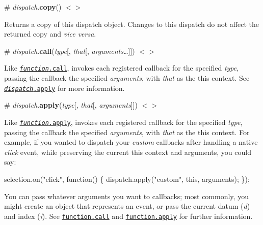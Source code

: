 \label{_dispatch_copy}%
\# {\itshape dispatch}.{\bfseries copy}() \href{https://github.com/d3/d3-dispatch/blob/master/src/dispatch.js#L49}{\tt $<$$>$}

Returns a copy of this dispatch object. Changes to this dispatch do not affect the returned copy and {\itshape vice versa}.

\label{_dispatch_call}%
\# {\itshape dispatch}.{\bfseries call}({\itshape type}\mbox{[}, {\itshape that}\mbox{[}, {\itshape arguments…}\mbox{]}\mbox{]}) \href{https://github.com/d3/d3-dispatch/blob/master/src/dispatch.js#L54}{\tt $<$$>$}

Like \href{https://developer.mozilla.org/en-US/docs/Web/JavaScript/Reference/Global_Objects/Function/call}{\tt {\itshape function}.call}, invokes each registered callback for the specified {\itshape type}, passing the callback the specified {\itshape arguments}, with {\itshape that} as the {\ttfamily this} context. See \href{#dispatch_apply}{\tt {\itshape dispatch}.apply} for more information.

\label{_dispatch_apply}%
\# {\itshape dispatch}.{\bfseries apply}({\itshape type}\mbox{[}, {\itshape that}\mbox{[}, {\itshape arguments}\mbox{]}\mbox{]}) \href{https://github.com/d3/d3-dispatch/blob/master/src/dispatch.js#L59}{\tt $<$$>$}

Like \href{https://developer.mozilla.org/en-US/docs/Web/JavaScript/Reference/Global_Objects/Function/call}{\tt {\itshape function}.apply}, invokes each registered callback for the specified {\itshape type}, passing the callback the specified {\itshape arguments}, with {\itshape that} as the {\ttfamily this} context. For example, if you wanted to dispatch your {\itshape custom} callbacks after handling a native {\itshape click} event, while preserving the current {\ttfamily this} context and arguments, you could say\+:


\begin{DoxyCode}
selection.on("click", function() \{
  dispatch.apply("custom", this, arguments);
\});
\end{DoxyCode}


You can pass whatever arguments you want to callbacks; most commonly, you might create an object that represents an event, or pass the current datum ({\itshape d}) and index ({\itshape i}). See \href{https://developer.mozilla.org/en/JavaScript/Reference/Global_Objects/Function/Call}{\tt function.\+call} and \href{https://developer.mozilla.org/en/JavaScript/Reference/Global_Objects/Function/Apply}{\tt function.\+apply} for further information. 